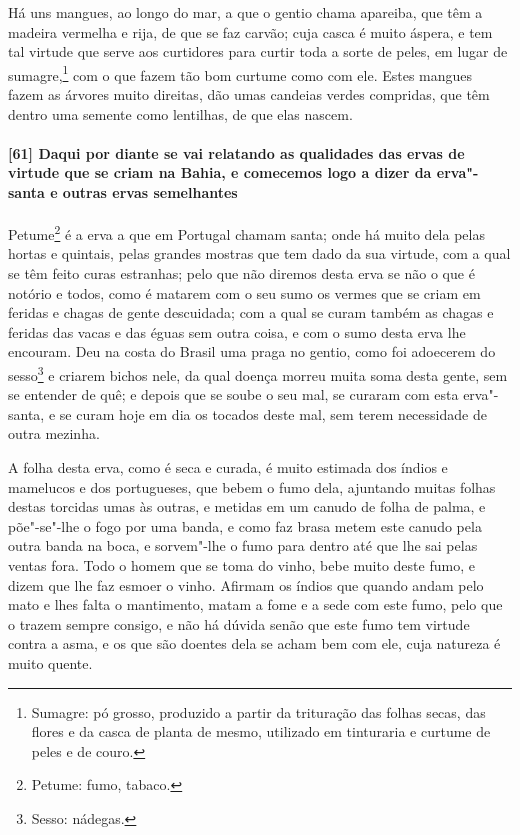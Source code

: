 \begin{linenumbers}
Há uns mangues, ao longo do mar, a que o gentio chama apareiba, que têm a madeira vermelha
e rija, de que se faz carvão; cuja casca é muito áspera, e tem tal virtude que serve aos
curtidores para curtir toda a sorte de peles, em lugar de sumagre,\footnote{ Sumagre: pó
grosso, produzido a partir da trituração das folhas secas, das flores e da casca de planta
de mesmo, utilizado em tinturaria e curtume de peles e de couro.} com o que fazem tão bom
curtume como com ele. Estes mangues fazem as árvores
muito direitas, dão umas candeias verdes compridas, que têm
dentro uma semente como lentilhas, de que elas nascem.

\paragraph{[61] Daqui por diante se vai relatando as qualidades das ervas de virtude que se
criam na Bahia, e comecemos logo a dizer da erva"-santa e outras ervas semelhantes}\quad
Petume\footnote{ Petume: fumo, tabaco.} é a erva a que em Portugal chamam santa; onde há
muito dela pelas hortas e quintais, pelas grandes mostras que tem dado da sua virtude, com
a qual se têm feito curas estranhas; pelo que não diremos desta erva se não o que é
notório e todos, como é matarem com o seu sumo os vermes que se criam em feridas e chagas
de gente descuidada; com a qual se curam também as chagas e feridas das vacas e das éguas
sem outra coisa, e com o sumo desta erva lhe encouram. Deu na costa do Brasil uma praga no
gentio, como foi adoecerem do sesso\footnote{ Sesso: nádegas.} e criarem bichos
nele, da qual doença morreu muita soma desta gente, sem se entender de quê; e depois que
se soube o seu mal, se curaram com esta erva"-santa, e se curam hoje em dia os tocados
deste mal, sem terem necessidade de outra mezinha.

A folha desta erva, como é seca e curada, é muito estimada dos índios e mamelucos e dos
portugueses, que bebem o fumo dela, ajuntando muitas folhas destas torcidas umas às
outras, e metidas em um canudo de folha de palma, e põe"-se"-lhe o fogo por uma banda, e
como faz brasa metem este canudo pela outra banda na boca, e sorvem"-lhe o fumo para dentro
até que lhe sai pelas ventas fora. Todo o homem que se toma do vinho, bebe muito deste
fumo, e dizem que lhe faz esmoer o vinho. Afirmam os índios que quando andam pelo mato e
lhes falta o mantimento, matam a fome e a sede com este fumo, pelo que o trazem sempre
consigo, e não há dúvida senão que este fumo tem virtude contra a asma, e os que são
doentes dela se acham bem com ele, cuja natureza é muito quente.


\end{linenumbers}
